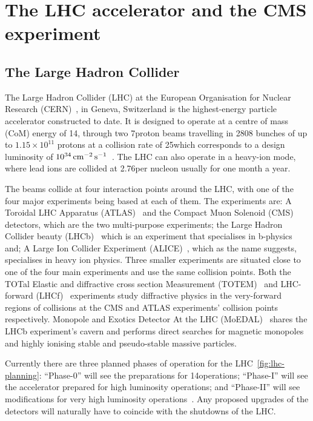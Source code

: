 \chapter{The LHC accelerator and the CMS experiment}\label{chapter:lhc-cms}
\section{The Large Hadron Collider}\label{sec:lhc}

The Large Hadron Collider (LHC) at the European Organisation for Nuclear Research (CERN)~\cite{Bruning:782076}, in Geneva, Switzerland is the highest-energy particle accelerator constructed to date. 
It is designed to operate at a centre of mass (CoM) energy of 14\TeV, through two 7\TeV proton beams travelling in 2808 bunches of up to $1.15 \times 10^{11}$ protons at a collision rate of 25\ns which corresponds to a design luminosity of $10^{34}\,\text{cm}^\text{$-$2}\,\text{s}^\text{$-$1}$~\cite{Bayatian:2006zz}. 
The LHC can also operate in a heavy-ion mode, where lead ions are collided at 2.76\TeV per nucleon usually for one month a year.

The beams collide at four interaction points around the LHC, with one of the four major experiments being based at each of them. 
The experiments are: A Toroidal LHC Apparatus (ATLAS)~\cite{Aad:2008zzm} and the Compact Muon Solenoid (CMS)~\cite{oldcms} detectors, which are the two multi-purpose experiments; the Large Hadron Collider beauty (LHCb)~\cite{Alves:2008zz} which is an experiment that specialises in b-physics and; A Large Ion Collider Experiment (ALICE)~\cite{Aamodt:2008zz}, which as the name suggests, specialises in heavy ion physics.
Three smaller experiments are situated close to one of the four main experiments and use the same collision points.
Both the TOTal Elastic and diffractive cross section Measurement (TOTEM)~\cite{Anelli:2008zza} and LHC-forward (LHCf)~\cite{Adriani:2008zz} experiments study diffractive physics in the very-forward regions of collisions at the CMS and ATLAS experiments' collision points respectively.
Monopole and Exotics Detector At the LHC (MoEDAL)~\cite{Pinfold:2009oia} shares the LHCb experiment's cavern and performs direct searches for magnetic monopoles and highly ionising stable and pseudo-stable massive particles.

Currently there are three planned phases of operation for the LHC~\ref{fig:lhc-planning}: ``Phase-0'' will see the preparations for 14\TeV operations; ``Phase-I'' will see the accelerator prepared for high luminosity operations; and ``Phase-II'' will see modifications for very high luminosity operations~\cite{ECFA}. Any proposed upgrades of the detectors will naturally have to coincide with the shutdowns of the LHC.

